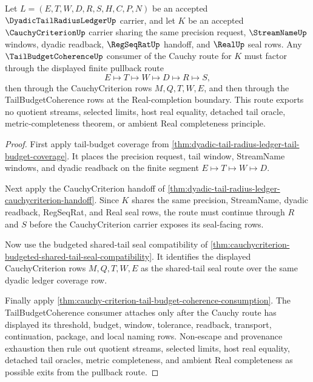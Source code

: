 \begin{theorem}
\label{thm:dyadic-tail-radius-ledger-cauchycriterion-tailbudgetcoherence-pullback}
Let $L=(E,T,W,D,R,S,H,C,P,N)$ be an accepted $\DyadicTailRadiusLedgerUp$ carrier, and let $K$ be an accepted $\CauchyCriterionUp$ carrier sharing the same precision request, $\StreamNameUp$ windows, dyadic readback, $\RegSeqRatUp$ handoff, and $\RealUp$ seal rows. Any $\TailBudgetCoherenceUp$ consumer of the Cauchy route for $K$ must factor through the displayed finite pullback route
$$
E \longmapsto T \longmapsto W \longmapsto D \longmapsto R \longmapsto S,
$$
then through the CauchyCriterion rows $M,Q,T,W,E$, and then through the TailBudgetCoherence rows at the Real-completion boundary. This route exports no quotient streams, selected limits, host real equality, detached tail oracle, metric-completeness theorem, or ambient Real completeness principle.
\end{theorem}
\begin{proof}
First apply tail-budget coverage from \autoref{thm:dyadic-tail-radius-ledger-tail-budget-coverage}. It places the precision request, tail window, StreamName windows, and dyadic readback on the finite segment $E \longmapsto T \longmapsto W \longmapsto D$.

Next apply the CauchyCriterion handoff of \autoref{thm:dyadic-tail-radius-ledger-cauchycriterion-handoff}. Since $K$ shares the same precision, StreamName, dyadic readback, RegSeqRat, and Real seal rows, the route must continue through $R$ and $S$ before the CauchyCriterion carrier exposes its seal-facing rows.

Now use the budgeted shared-tail seal compatibility of \autoref{thm:cauchycriterion-budgeted-shared-tail-seal-compatibility}. It identifies the displayed CauchyCriterion rows $M,Q,T,W,E$ as the shared-tail seal route over the same dyadic ledger coverage row.

Finally apply \autoref{thm:cauchy-criterion-tail-budget-coherence-consumption}. The TailBudgetCoherence consumer attaches only after the Cauchy route has displayed its threshold, budget, window, tolerance, readback, transport, continuation, package, and local naming rows. Non-escape and provenance exhaustion then rule out quotient streams, selected limits, host real equality, detached tail oracles, metric completeness, and ambient Real completeness as possible exits from the pullback route.
\end{proof}

